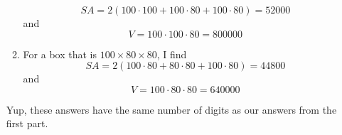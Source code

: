 \documentclass[nooutcomes,noauthor,hints]{ximera}
\begin{document}
\begin{question}
\begin{freeResponse}
\begin{enumerate}
\begin{enumerate}
         \[
         SA = 2(100\cdot 100 + 100\cdot 80 + 100\cdot 80) = 52000 
         \]
         and
         \[
         V = 100\cdot 100\cdot 80 =  800000 
         \]
       \item For a box that is  $100\times 80 \times 80$, I find
         \[
         SA = 2(100\cdot 80 + 80\cdot 80 + 100\cdot 80) = 44800
         \]
         and
         \[
         V = 100\cdot 80\cdot 80 = 640000
         \] 
       \end{enumerate}
       Yup, these answers have the same number of digits as our answers from the first part.       
     \end{enumerate}
   \end{freeResponse}
\end{question}
\mynewpage




\end{document}
